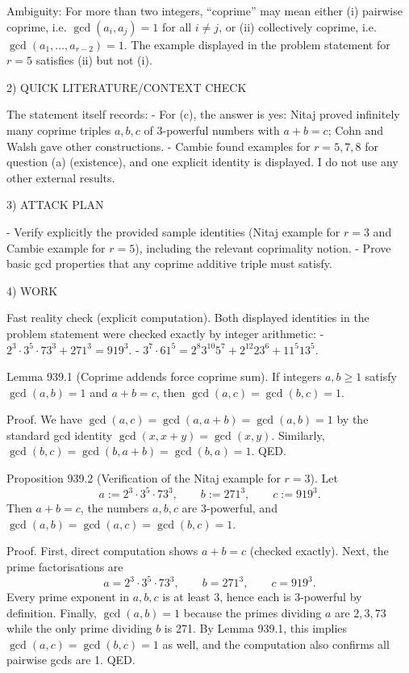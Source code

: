 Ambiguity: For more than two integers, ``coprime'' may mean either (i) pairwise coprime, i.e. \(\gcd(a_i,a_j)=1\) for all \(i\ne j\), or (ii) collectively coprime, i.e. \(\gcd(a_1,\dots,a_{r-2})=1\). The example displayed in the problem statement for \(r=5\) satisfies (ii) but not (i).

2) QUICK LITERATURE/CONTEXT CHECK

The statement itself records:
- For (c), the answer is yes: Nitaj proved infinitely many coprime triples \(a,b,c\) of 3-powerful numbers with \(a+b=c\); Cohn and Walsh gave other constructions.
- Cambie found examples for \(r=5,7,8\) for question (a) (existence), and one explicit identity is displayed.
I do not use any other external results.

3) ATTACK PLAN

- Verify explicitly the provided sample identities (Nitaj example for \(r=3\) and Cambie example for \(r=5\)), including the relevant coprimality notion.
- Prove basic gcd properties that any coprime additive triple must satisfy.

4) WORK

Fast reality check (explicit computation).
Both displayed identities in the problem statement were checked exactly by integer arithmetic:
- \(2^3\cdot 3^5\cdot 73^3+271^3=919^3\).
- \(3^7\cdot 61^5=2^8 3^{10}5^7 +2^{12}23^6 +11^5 13^5\).

Lemma 939.1 (Coprime addends force coprime sum).
If integers \(a,b\ge 1\) satisfy \(\gcd(a,b)=1\) and \(a+b=c\), then \(\gcd(a,c)=\gcd(b,c)=1\).

Proof.
We have \(\gcd(a,c)=\gcd(a,a+b)=\gcd(a,b)=1\) by the standard gcd identity \(\gcd(x,x+y)=\gcd(x,y)\). Similarly, \(\gcd(b,c)=\gcd(b,a+b)=\gcd(b,a)=1\). QED.

Proposition 939.2 (Verification of the Nitaj example for \(r=3\)).
Let
\[a:=2^3\cdot 3^5\cdot 73^3,\qquad b:=271^3,\qquad c:=919^3.
\]
Then \(a+b=c\), the numbers \(a,b,c\) are 3-powerful, and \(\gcd(a,b)=\gcd(a,c)=\gcd(b,c)=1\).

Proof.
First, direct computation shows \(a+b=c\) (checked exactly).
Next, the prime factorisations are
\[a=2^3\cdot 3^5\cdot 73^3,\qquad b=271^3,\qquad c=919^3.
\]
Every prime exponent in \(a,b,c\) is at least 3, hence each is 3-powerful by definition.
Finally, \(\gcd(a,b)=1\) because the primes dividing \(a\) are \(2,3,73\) while the only prime dividing \(b\) is 271. By Lemma 939.1, this implies \(\gcd(a,c)=\gcd(b,c)=1\) as well, and the computation also confirms all pairwise gcds are 1. QED.

